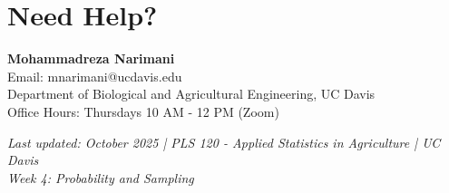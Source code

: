 \documentclass[11pt,a4paper]{article}
\begin{document}
\section{Need Help?}

\begin{infobox}
\textbf{Mohammadreza Narimani}\\
Email: mnarimani@ucdavis.edu\\
Department of Biological and Agricultural Engineering, UC Davis\\
Office Hours: Thursdays 10 AM - 12 PM (Zoom)
\end{infobox}

\vfill

\begin{center}
\textit{Last updated: October 2025 | PLS 120 - Applied Statistics in Agriculture | UC Davis}\\
\textit{Week 4: Probability and Sampling}
\end{center}
\end{document}
